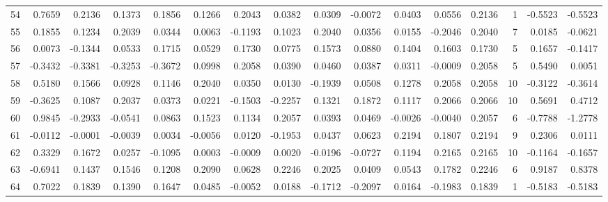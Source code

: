 \begin{tabular}{lrrrrrrrrrrrrrrr}
54  &      0.7659 &  0.2136 &  0.1373 &  0.1856 &  0.1266 &  0.2043 &  0.0382 &  0.0309 & -0.0072 &  0.0403 &   0.0556 &     0.2136 &      1 &                   -0.5523 &                    -0.5523 \\
55  &      0.1855 &  0.1234 &  0.2039 &  0.0344 &  0.0063 & -0.1193 &  0.1023 &  0.2040 &  0.0356 &  0.0155 &  -0.2046 &     0.2040 &      7 &                    0.0185 &                    -0.0621 \\
56  &      0.0073 & -0.1344 &  0.0533 &  0.1715 &  0.0529 &  0.1730 &  0.0775 &  0.1573 &  0.0880 &  0.1404 &   0.1603 &     0.1730 &      5 &                    0.1657 &                    -0.1417 \\
57  &     -0.3432 & -0.3381 & -0.3253 & -0.3672 &  0.0998 &  0.2058 &  0.0390 &  0.0460 &  0.0387 &  0.0311 &  -0.0009 &     0.2058 &      5 &                    0.5490 &                     0.0051 \\
58  &      0.5180 &  0.1566 &  0.0928 &  0.1146 &  0.2040 &  0.0350 &  0.0130 & -0.1939 &  0.0508 &  0.1278 &   0.2058 &     0.2058 &     10 &                   -0.3122 &                    -0.3614 \\
59  &     -0.3625 &  0.1087 &  0.2037 &  0.0373 &  0.0221 & -0.1503 & -0.2257 &  0.1321 &  0.1872 &  0.1117 &   0.2066 &     0.2066 &     10 &                    0.5691 &                     0.4712 \\
60  &      0.9845 & -0.2933 & -0.0541 &  0.0863 &  0.1523 &  0.1134 &  0.2057 &  0.0393 &  0.0469 & -0.0026 &  -0.0040 &     0.2057 &      6 &                   -0.7788 &                    -1.2778 \\
61  &     -0.0112 & -0.0001 & -0.0039 &  0.0034 & -0.0056 &  0.0120 & -0.1953 &  0.0437 &  0.0623 &  0.2194 &   0.1807 &     0.2194 &      9 &                    0.2306 &                     0.0111 \\
62  &      0.3329 &  0.1672 &  0.0257 & -0.1095 &  0.0003 & -0.0009 &  0.0020 & -0.0196 & -0.0727 &  0.1194 &   0.2165 &     0.2165 &     10 &                   -0.1164 &                    -0.1657 \\
63  &     -0.6941 &  0.1437 &  0.1546 &  0.1208 &  0.2090 &  0.0628 &  0.2246 &  0.2025 &  0.0409 &  0.0543 &   0.1782 &     0.2246 &      6 &                    0.9187 &                     0.8378 \\
64  &      0.7022 &  0.1839 &  0.1390 &  0.1647 &  0.0485 & -0.0052 &  0.0188 & -0.1712 & -0.2097 &  0.0164 &  -0.1983 &     0.1839 &      1 &                   -0.5183 &                    -0.5183 \\

\end{tabular}
